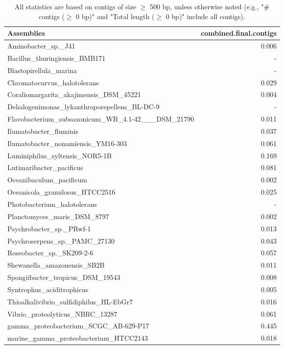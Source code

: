 \documentclass[12pt,a4paper]{article}
\begin{document}
\begin{table}[ht]
\begin{center}
\caption{All statistics are based on contigs of size $\geq$ 500 bp, unless otherwise noted (e.g., "\# contigs ($\geq$ 0 bp)" and "Total length ($\geq$ 0 bp)" include all contigs).}
\begin{tabular}{|l*{1}{|r}|}
\hline
Assemblies & combined.final.contigs \\ \hline
Aminobacter\_sp.\_J41 & 0.006 \\ \hline
Bacillus\_thuringiensis\_BMB171 & - \\ \hline
Blastopirellula\_marina & - \\ \hline
Chromatocurvus\_halotolerans & 0.029 \\ \hline
Coraliomargarita\_akajimensis\_DSM\_45221 & 0.004 \\ \hline
Dehalogenimonas\_lykanthroporepellens\_BL-DC-9 & - \\ \hline
Flavobacterium\_subsaxonicum\_WB\_4.1-42\_\_\_DSM\_21790 & 0.011 \\ \hline
Ilumatobacter\_fluminis & 0.037 \\ \hline
Ilumatobacter\_nonamiensis\_YM16-303 & 0.061 \\ \hline
Luminiphilus\_syltensis\_NOR5-1B & 0.169 \\ \hline
Lutimaribacter\_pacificus & 0.081 \\ \hline
Oceanibaculum\_pacificum & 0.002 \\ \hline
Oceanicola\_granulosus\_HTCC2516 & 0.025 \\ \hline
Photobacterium\_halotolerans & - \\ \hline
Planctomyces\_maris\_DSM\_8797 & 0.002 \\ \hline
Psychrobacter\_sp.\_PRwf-1 & 0.013 \\ \hline
Psychroserpens\_sp.\_PAMC\_27130 & 0.043 \\ \hline
Roseobacter\_sp.\_SK209-2-6 & 0.057 \\ \hline
Shewanella\_amazonensis\_SB2B & 0.011 \\ \hline
Spongiibacter\_tropicus\_DSM\_19543 & 0.008 \\ \hline
Syntrophus\_aciditrophicus & 0.005 \\ \hline
Thioalkalivibrio\_sulfidiphilus\_HL-EbGr7 & 0.016 \\ \hline
Vibrio\_proteolyticus\_NBRC\_13287 & 0.061 \\ \hline
gamma\_proteobacterium\_SCGC\_AB-629-P17 & 0.445 \\ \hline
marine\_gamma\_proteobacterium\_HTCC2143 & 0.018 \\ \hline
\end{tabular}
\end{center}
\end{table}
\end{document}

